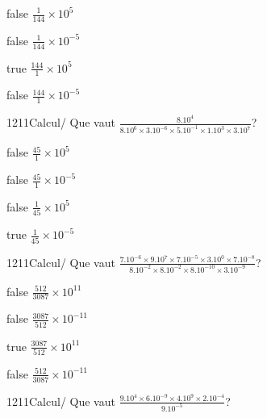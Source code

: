\documentclass[11pt]{article}
\begin{document}
            \begin{reponses}
                \item[false] $\frac{1}{144}\times 10^{5}$
                \item[false] $\frac{1}{144}\times 10^{-5}$
                \item[true] $\frac{144}{1}\times 10^{5}$
                \item[false] $\frac{144}{1}\times 10^{-5}$
            \end{reponses}
            
            \begin{question}{1211}{Calcul}{}{/}
                Que vaut $\frac{8.10^{4}}{8.10^{6}\times 3.10^{-6}\times 5.10^{-1}\times 1.10^{3}\times 3.10^{7}}$?
            \end{question}
            
            \begin{reponses}
                \item[false] $\frac{45}{1}\times 10^{5}$
                \item[false] $\frac{45}{1}\times 10^{-5}$
                \item[false] $\frac{1}{45}\times 10^{5}$
                \item[true] $\frac{1}{45}\times 10^{-5}$
            \end{reponses}
            
            \begin{question}{1211}{Calcul}{}{/}
                Que vaut $\frac{7.10^{-6}\times 9.10^{7}\times 7.10^{-5}\times 3.10^{0}\times 7.10^{-8}}{8.10^{-2}\times 8.10^{-2}\times 8.10^{-10}\times 3.10^{-9}}$?
            \end{question}
            
            \begin{reponses}
                \item[false] $\frac{512}{3087}\times 10^{11}$
                \item[false] $\frac{3087}{512}\times 10^{-11}$
                \item[true] $\frac{3087}{512}\times 10^{11}$
                \item[false] $\frac{512}{3087}\times 10^{-11}$
            \end{reponses}
            
            \begin{question}{1211}{Calcul}{}{/}
                Que vaut $\frac{9.10^{4}\times 6.10^{-9}\times 4.10^{9}\times 2.10^{-4}}{9.10^{-5}}$?
            \end{question}
            
\end{document}
